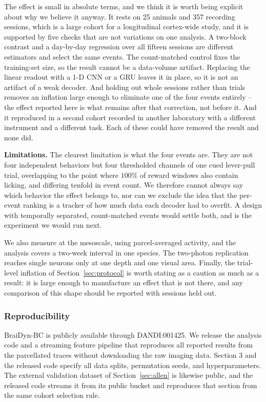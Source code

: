 \documentclass{article}
\begin{document}
The effect is small in absolute terms, and we think it is worth being explicit about why we believe
it anyway. It rests on 25 animals and 357 recording sessions, which is a large cohort for a
longitudinal cortex-wide study, and it is supported by five checks that are not variations on one
analysis. A two-block contrast and a day-by-day regression over all fifteen sessions are different
estimators and select the same events. The count-matched control fixes the training-set size, so the
result cannot be a data-volume artifact. Replacing the linear readout with a 1-D CNN or a GRU leaves
it in place, so it is not an artifact of a weak decoder. And holding out whole sessions rather than
trials removes an inflation large enough to eliminate one of the four events entirely -- the effect
reported here is what remains after that correction, not before it. And it reproduced in a second
cohort recorded in another laboratory with a different instrument and a different task. Each of
these could have removed the result and none did.

\textbf{Limitations.} The clearest limitation is what the four events are. They are not four
independent behaviors but four thresholded channels of one cued lever-pull trial, overlapping to the
point where $100\%$ of reward windows also contain licking, and differing tenfold in event count. We
therefore cannot always say which behavior the effect belongs to, nor can we exclude the idea that
the per-event ranking is a tracker of how much data each decoder had to overfit. A design with
temporally separated, count-matched events would settle both, and is the experiment we would run
next.

We also measure at the mesoscale, using parcel-averaged activity, and the analysis covers a two-week
interval in one species. The two-photon replication reaches single neurons only at one depth and one
visual area. Finally, the trial-level inflation of
Section~\ref{sec:protocol} is worth stating as a caution as much as a result: it is large enough to
manufacture an effect that is not there, and any comparison of this shape should be reported with
sessions held out.

\subsubsection*{Reproducibility}
BraiDyn-BC is publicly available through DANDI:001425. We release the analysis code and a streaming
feature pipeline that reproduces all reported results from the parcellated traces without downloading
the raw imaging data. Section 3 and the released code specify all data splits, permutation seeds, and
hyperparameters. The external validation dataset of Section~\ref{sec:allen} is likewise public, and
the released code streams it from its public bucket and reproduces that section from the same cohort
selection rule.
\end{document}
